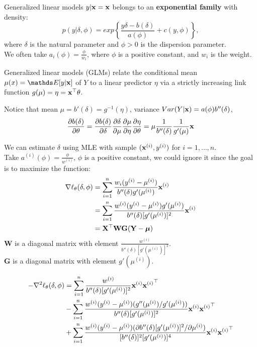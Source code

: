 \documentclass[11pt,compress,t,notes=noshow, xcolor=table]{beamer}
\begin{document}
\begin{vbframe}{Generalized linear models}
$y|\mathbf{x}=\mathbf{x}$ belongs to an \textbf{exponential family} with density:
$$ p(y|\delta, \phi) = exp \left\{ \frac{y\delta-b(\delta)}{a(\phi)} + c(y,\phi) \right\}, $$
where $\delta$ is the natural parameter and $\phi > 0$ is the dispersion parameter.\\
We often take $a_i(\phi) = \frac{\phi}{w_i}$, where $\phi$ is a positive constant, and $w_i$ is the weight.

\lz

Generalized linear models (GLMs) relate the conditional mean $\mu(x)=\E[y|\xv]$ of $Y$ to a linear predictor $\eta$ via a 
strictly increasing link function $g(\mu)=\eta=\mathbf{x}^\top\theta$.\\

\lz

Notice that mean $\mu=b'(\delta)=g^{-1}(\eta)$, variance $Var(Y|\mathbf{x})=a(\phi)b''(\delta)$, \\
$$\frac{\partial{b(\delta)}}{\partial{\theta}}
=\frac{\partial{b(\delta)}}{\partial{\delta}}\frac{\partial{\delta}}{\partial{\mu}}\frac{\partial{\mu}}{\partial{\eta}}\frac{\partial{\eta}}{\partial{\theta}}
=\mu \frac{1}{b''(\delta)} \frac{1}{g'(\mu)} \mathbf{x}$$

\framebreak
We can estimate $\delta$ using MLE with sample $(\mathbf{x}^{(i)},y^{(i)})$ for $i=1,\ldots,n$.\\
Take $a^{(i)}(\phi) = \frac{\phi}{w^{(i)}}$, $\phi$ is a positive constant, 
we could ignore it since the goal is to maximize the function:\\
\begin{align*}
\nabla \ell_{\theta}(\delta, \phi) &= \sum\limits_{i=1}^n \frac{w_i(y^{(i)}-\mu^{(i)})}{b''(\delta)g'(\mu^{(i)})}\mathbf{x}^{(i)}\\
 &= \sum\limits_{i=1}^n \frac{w^{(i)}(y^{(i)}-\mu^{(i)})g'(\mu^{(i)})}{b''(\delta)[g'(\mu^{(i)})]^2}\mathbf{x}^{(i)}\\
 &= \mathbf{X}^\top \mathbf{W} \mathbf{G} (\mathbf{Y}-\bm{\mu})
\end{align*}
\lz
$\mathbf{W}$ is a diagonal matrix with element $\frac{w^{(i)}}{b''(\delta)[g'(\mu^{(i)})]^2}$.\\
$\mathbf{G}$ is a diagonal matrix with element $g'(\mu^{(i)})$.\\

\framebreak

\begin{align*}
-\nabla^2 \ell_{\theta}(\delta, \phi)
  & = \sum\limits_{i=1}^n \frac{w^{(i)}}{b''(\delta)[g'(\mu^{(i)})]^2}\mathbf{x}^{(i)}{\mathbf{x}^{(i)}}^\top \\
  & - \sum\limits_{i=1}^n \frac{w^{(i)}(y^{(i)}-\mu^{(i)})(g''(\mu^{(i)})/g'(\mu^{(i)}))}{b''(\delta)[g'(\mu^{(i)})]^2}\mathbf{x}^{(i)}{\mathbf{x}^{(i)}}^\top \\ 
  & + \sum\limits_{i=1}^n \frac{w^{(i)}(y^{(i)}-\mu^{(i)})(\partial{b''(\delta)[g'(\mu^{(i)})]^2}/\partial{\mu^{(i)}})}{[b''(\delta)]^2[g'(\mu^{(i)})]^4}\mathbf{x}^{(i)}{\mathbf{x}^{(i)}}^\top
\end{align*}


\end{vbframe}
\end{document}
